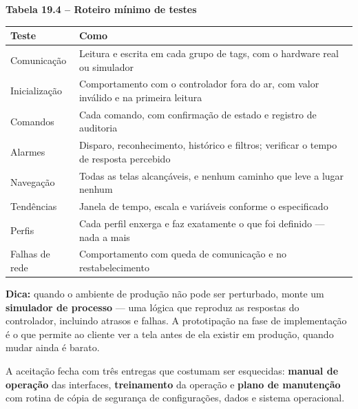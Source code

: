 \textbf{Tabela 19.4 -- Roteiro mínimo de testes}

\begin{longtable}[]{@{}
  >{\raggedright\arraybackslash}p{}
  >{\raggedright\arraybackslash}p{}@{}}
\toprule\noalign{}
\begin{minipage}[b]{\linewidth}\raggedright
Teste
\end{minipage} & \begin{minipage}[b]{\linewidth}\raggedright
Como
\end{minipage} \\
\midrule\noalign{}
\endhead
\bottomrule\noalign{}
\endlastfoot
Comunicação & Leitura e escrita em cada grupo de tags, com o hardware real ou simulador \\
Inicialização & Comportamento com o controlador fora do ar, com valor inválido e na primeira leitura \\
Comandos & Cada comando, com confirmação de estado e registro de auditoria \\
Alarmes & Disparo, reconhecimento, histórico e filtros; verificar o tempo de resposta percebido \\
Navegação & Todas as telas alcançáveis, e nenhum caminho que leve a lugar nenhum \\
Tendências & Janela de tempo, escala e variáveis conforme o especificado \\
Perfis & Cada perfil enxerga e faz exatamente o que foi definido --- nada a mais \\
Falhas de rede & Comportamento com queda de comunicação e no restabelecimento \\
\end{longtable}

\begin{caixadica}

\textbf{Dica:} quando o ambiente de produção não pode ser perturbado, monte um \textbf{simulador de
processo} --- uma lógica que reproduz as respostas do controlador, incluindo atrasos e falhas. A
prototipação na fase de implementação é o que permite ao cliente ver a tela antes de ela existir em
produção, quando mudar ainda é barato.

\end{caixadica}

A aceitação fecha com três entregas que costumam ser esquecidas: \textbf{manual de operação} das
interfaces, \textbf{treinamento} da operação e \textbf{plano de manutenção} com rotina de cópia de segurança de
configurações, dados e sistema operacional.

